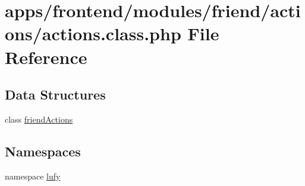\hypertarget{frontend_2modules_2friend_2actions_2actions_8class_8php}{\section{apps/frontend/modules/friend/actions/actions.class.\-php File Reference}
\label{frontend_2modules_2friend_2actions_2actions_8class_8php}
}
\subsection*{Data Structures}
\begin{DoxyCompactItemize}
\item 
class \hyperlink{classfriend_actions}{friend\-Actions}
\end{DoxyCompactItemize}
\subsection*{Namespaces}
\begin{DoxyCompactItemize}
\item 
namespace \hyperlink{namespacelufy}{lufy}
\end{DoxyCompactItemize}
